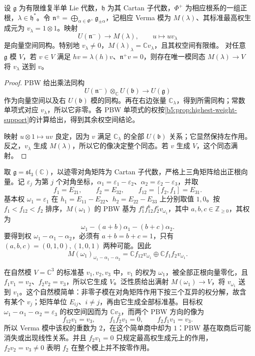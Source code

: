 \begin{proposition}\label{b5:prop:verma-pbw-universal}
	设 \(\mathfrak g\) 为有限维复半单 Lie 代数，\(\mathfrak h\) 为其 Cartan 子代数，\(\Phi^+\) 为相应根系的一组正根，\(\lambda\in\mathfrak h^*\)。令 \(\mathfrak n^\pm=\bigoplus_{\alpha\in\Phi^+}\mathfrak g_{\pm\alpha}\)，记相应 Verma 模为 \(M(\lambda)\)、其标准最高权生成元为 \(v_\lambda=1\otimes1\)。映射
	\[
		U(\mathfrak n^-)\longrightarrow M(\lambda),\qquad u\longmapsto uv_\lambda
	\]
	是向量空间同构。特别地 \(v_\lambda\ne0\)，\(M(\lambda)_\lambda=\mathbb Cv_\lambda\)，且其权空间有限维。 对任意 \(\mathfrak g\) 模 \(V\)，若 \(v\in V\) 满足 \(hv=\lambda(h)v\)、\(\mathfrak n^+v=0\)，则存在唯一模同态 \(M(\lambda)\to V\) 将 \(v_\lambda\) 送到 \(v\)。
\end{proposition}
\begin{proof}
	PBW 给出乘法同构
	\[
		U(\mathfrak n^-)\otimes_{\mathbb C}U(\mathfrak b) \longrightarrow U(\mathfrak g)
	\]
	作为向量空间以及右 \(U(\mathfrak b)\) 模的同构。再在右边张量 \(\mathbb C_\lambda\)，得到所需同构；常数单项式对应 \(v_\lambda\)，所以它非零。各 PBW 单项式的权按\cref{b5:prop:highest-weight-support}的计算给出，得到其余权空间结论。

	映射 \(u\otimes1\mapsto uv\) 良定，因为 \(v\) 满足 \(\mathbb C_\lambda\) 的全部 \(U(\mathfrak b)\) 关系；它显然保持左作用。反之，\(v_\lambda\) 生成 \(M(\lambda)\)，所以它的像决定整个同态。若 \(v\) 生成 \(V\)，这个同态满射。
\end{proof}

取 \(\mathfrak g=\mathfrak{sl}_3(\mathbb C)\)，以迹零对角矩阵为 Cartan 子代数，严格上三角矩阵给出正根向量。记 \(\varepsilon_j\) 为第 \(j\) 个对角坐标，\(\alpha_1=\varepsilon_1-\varepsilon_2\)、\(\alpha_2=\varepsilon_2-\varepsilon_3\)，并取
\[
	f_1=E_{21},\qquad f_2=E_{32},\qquad f_{12}=[f_2,f_1]=E_{31}.
\]
基本权 \(\omega_1=\varepsilon_1\) 在 \(h_1=E_{11}-E_{22}\)、\(h_2=E_{22}-E_{33}\) 上分别取值 \(1,0\)。按 \(f_1<f_{12}<f_2\) 排序，\(M(\omega_1)\) 的 PBW 基为 \(f_1^a f_{12}^b f_2^c v_{\omega_1}\)，其中 \(a,b,c\in\mathbb Z_{\ge0}\)，其权为
\[
	\omega_1-(a+b)\alpha_1-(b+c)\alpha_2.
\]
要得到权 \(\omega_1-\alpha_1-\alpha_2\)，必须有 \(a+b=b+c=1\)，只有 \((a,b,c)=(0,1,0),(1,0,1)\) 两种可能。因此
\[
	M(\omega_1)_{\omega_1-\alpha_1-\alpha_2} =\mathbb C f_{12}v_{\omega_1} \oplus\mathbb C f_1f_2v_{\omega_1}.
\]

\ProseParagraphBreak
在自然模 \(V=\mathbb C^3\) 的标准基 \(v_1,v_2,v_3\) 中，\(v_1\) 的权为 \(\omega_1\)，被全部正根向量零化，且 \(f_1v_1=v_2\)、\(f_2v_2=v_3\)，所以它生成 \(V\)。泛性质给出满射 \(M(\omega_1)\to V\)，将 \(v_{\omega_1}\) 送到 \(v_1\)。这个自然模简单：非零子模在对角矩阵作用下按三个互异的权分解，故含有某个 \(v_j\)；矩阵单位 \(E_{ij}\)、\(i\ne j\)，再由它生成全部标准基。目标权 \(\omega_1-\alpha_1-\alpha_2=\varepsilon_3\) 的权空间因而为 \(\mathbb Cv_3\)，而两个 PBW 方向的像为
\[
	f_{12}v_1=v_3,\qquad f_1f_2v_1=0,\qquad f_2f_1v_1=v_3.
\]
所以 Verma 模中该权的重数为 \(2\)，在这个简单商中却为 \(1\)：PBW 基在取商后可能消失或出现线性关系。并且 \(f_2v_1=0\) 只规定最高权生成元上的作用，\(f_2v_2=v_3\ne0\) 表明 \(f_2\) 在整个模上并不按零作用。

